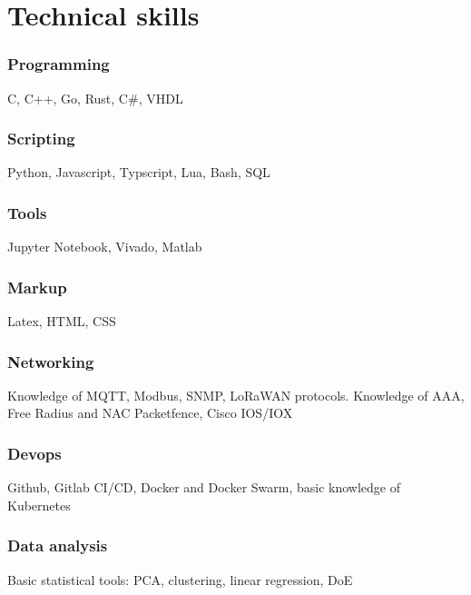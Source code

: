 \documentclass[11pt,a4paper]{article}
\begin{document}
  \section{Technical skills}
  \subsubsection{Programming}
  C, C++, Go, Rust, C\#, VHDL

  \subsubsection{Scripting}
  Python, Javascript, Typscript, Lua, Bash, SQL

  \subsubsection{Tools}
  Jupyter Notebook, Vivado, Matlab

  \subsubsection{Markup}
  Latex, HTML, CSS

  \subsubsection{Networking}
  Knowledge of MQTT, Modbus, SNMP, LoRaWAN protocols. Knowledge of AAA, Free Radius and NAC Packetfence, Cisco IOS/IOX

  \subsubsection{Devops}
  Github, Gitlab CI/CD, Docker and Docker Swarm, basic knowledge of Kubernetes

  \subsubsection{Data analysis}
  Basic statistical tools: PCA, clustering, linear regression, DoE
\end{document}
